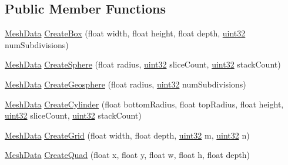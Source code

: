 \subsection*{Public Member Functions}
\begin{DoxyCompactItemize}
\item 
\hyperlink{struct_geometry_generator_1_1_mesh_data}{Mesh\+Data} \hyperlink{class_geometry_generator_a9ebf88d1bee287c6e211bff43fbdd3a0_a9ebf88d1bee287c6e211bff43fbdd3a0}{Create\+Box} (float width, float height, float depth, \hyperlink{class_geometry_generator_a37fc6dd464913f90a718f59862a9beeb_a37fc6dd464913f90a718f59862a9beeb}{uint32} num\+Subdivisions)
\item 
\hyperlink{struct_geometry_generator_1_1_mesh_data}{Mesh\+Data} \hyperlink{class_geometry_generator_a61677b3472294c52b544670722d22f0b_a61677b3472294c52b544670722d22f0b}{Create\+Sphere} (float radius, \hyperlink{class_geometry_generator_a37fc6dd464913f90a718f59862a9beeb_a37fc6dd464913f90a718f59862a9beeb}{uint32} slice\+Count, \hyperlink{class_geometry_generator_a37fc6dd464913f90a718f59862a9beeb_a37fc6dd464913f90a718f59862a9beeb}{uint32} stack\+Count)
\item 
\hyperlink{struct_geometry_generator_1_1_mesh_data}{Mesh\+Data} \hyperlink{class_geometry_generator_ac29d9710556efda67adf2969b3d59efe_ac29d9710556efda67adf2969b3d59efe}{Create\+Geosphere} (float radius, \hyperlink{class_geometry_generator_a37fc6dd464913f90a718f59862a9beeb_a37fc6dd464913f90a718f59862a9beeb}{uint32} num\+Subdivisions)
\item 
\hyperlink{struct_geometry_generator_1_1_mesh_data}{Mesh\+Data} \hyperlink{class_geometry_generator_a6d2867280024eaf02c0643c765dfdd2b_a6d2867280024eaf02c0643c765dfdd2b}{Create\+Cylinder} (float bottom\+Radius, float top\+Radius, float height, \hyperlink{class_geometry_generator_a37fc6dd464913f90a718f59862a9beeb_a37fc6dd464913f90a718f59862a9beeb}{uint32} slice\+Count, \hyperlink{class_geometry_generator_a37fc6dd464913f90a718f59862a9beeb_a37fc6dd464913f90a718f59862a9beeb}{uint32} stack\+Count)
\item 
\hyperlink{struct_geometry_generator_1_1_mesh_data}{Mesh\+Data} \hyperlink{class_geometry_generator_a594d746f5a6a3a645ea2c85a9feabafe_a594d746f5a6a3a645ea2c85a9feabafe}{Create\+Grid} (float width, float depth, \hyperlink{class_geometry_generator_a37fc6dd464913f90a718f59862a9beeb_a37fc6dd464913f90a718f59862a9beeb}{uint32} m, \hyperlink{class_geometry_generator_a37fc6dd464913f90a718f59862a9beeb_a37fc6dd464913f90a718f59862a9beeb}{uint32} n)
\item 
\hyperlink{struct_geometry_generator_1_1_mesh_data}{Mesh\+Data} \hyperlink{class_geometry_generator_af9ce9e29c19dc145d8a964f44359ae90_af9ce9e29c19dc145d8a964f44359ae90}{Create\+Quad} (float x, float y, float w, float h, float depth)
\end{DoxyCompactItemize}


